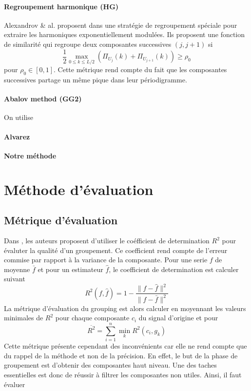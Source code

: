 \documentclass{gretsi}
\begin{document}
\paragraph{Regroupement harmonique (HG)}\label{par:alex} Alexandrov \& al. proposent dans \cite{alexandrov_05_auto} une stratégie de regroupement spéciale pour extraire les harmoniques exponentiellement modulées. Ils proposent une fonction de similarité qui regroupe deux composantes successives $(j, j+1)$ si$$
\frac{1}{2}\max_{0\le k \le L/2}\left(\Pi_{U_j}(k) + \Pi_{U_{j+1}}(k)\right) \ge \rho_0
$$ pour $\rho_0\in \left[0, 1\right]$. Cette métrique rend compte du fait que les composantes successives partage un même pique dans leur périodigramme.


\paragraph{Abalov method (GG2)}
\label{par:abalov}
\cite{abalov_14_auto}
On utilise
\paragraph{Alvarez}
\label{par:alva}
\cite{alvarez_2013_auto}
\paragraph{Notre méthode}
\label{par:tomtom}


        


\section{Méthode d'évaluation}
\label{sec:eval}

\subsection{Métrique d'évaluation}
\label{sub:}
Dans \cite{abalov_14_aut}, les auteurs proposent d'utiliser le coéfficient de determination $R^2$ pour évaluter la qualité d'un groupement. Ce coefficient rend compte de l'erreur commise par rapport à la variance de la composante. Pour une serie $f$ de moyenne $\bar f$ et pour un estimateur $\hat f$, le coefficient de determination est calculer suivant$$
R^2(f, \hat f) = 1 - \frac{\|f-\hat f\|^2}{\|f-\bar f\|^2}
$$ La métrique d'évaluation du grouping est alors calculer  en moyennant les valeurs minimales de $R^2$ pour chaque composante $c_i$ du signal d'origine et pour $$
\overline{ R^2} = \sum_{i=1}^n \min_k R^2(c_i, g_k)
$$Cette métrique présente cependant des inconvénients car elle ne rend compte que du rappel de la méthode et non de la précision. En effet, le but de la phase de groupement est d'obtenir des composantes haut niveau. Une des taches essentielles est donc de réussir à filtrer les composantes non utiles. Ainsi, il faut évaluer
\end{document}
